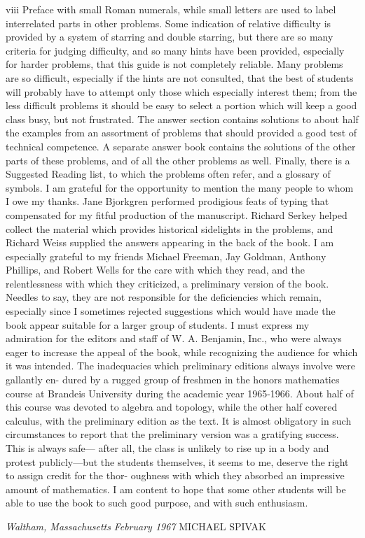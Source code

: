 viii Preface
with small Roman numerals, while small letters are used to label interrelated parts
in other problems. Some indication of relative difficulty is provided by a system of
starring and double starring, but there are so many criteria for judging difficulty,
and so many hints have been provided, especially for harder problems, that this
guide is not completely reliable. Many problems are so difficult, especially if the
hints are not consulted, that the best of students will probably have to attempt only
those which especially interest them; from the less difficult problems it should be
easy to select a portion which will keep a good class busy, but not frustrated. The
answer section contains solutions to about half the examples from an assortment
of problems that should provided a good test of technical competence. A separate
answer book contains the solutions of the other parts of these problems, and of all
the other problems as well. Finally, there is a Suggested Reading list, to which the
problems often refer, and a glossary of symbols.
I am grateful for the opportunity to mention the many people to whom I owe my
thanks. Jane Bjorkgren performed prodigious feats of typing that compensated for
my fitful production of the manuscript. Richard Serkey helped collect the material
which provides historical sidelights in the problems, and Richard Weiss supplied
the answers appearing in the back of the book. I am especially grateful to my
friends Michael Freeman, Jay Goldman, Anthony Phillips, and Robert Wells for
the care with which they read, and the relentlessness with which they criticized, a
preliminary version of the book. Needles to say, they are not responsible for the
deficiencies which remain, especially since I sometimes rejected suggestions which
would have made the book appear suitable for a larger group of students. I must
express my admiration for the editors and staff of W. A. Benjamin, Inc., who were
always eager to increase the appeal of the book, while recognizing the audience
for which it was intended.
The inadequacies which preliminary editions always involve were gallantly en-
dured by a rugged group of freshmen in the honors mathematics course at Brandeis
University during the academic year 1965-1966. About half of this course was
devoted to algebra and topology, while the other half covered calculus, with the
preliminary edition as the text. It is almost obligatory in such circumstances to
report that the preliminary version was a gratifying success. This is always safe—
after all, the class is unlikely to rise up in a body and protest publicly—but the
students themselves, it seems to me, deserve the right to assign credit for the thor-
oughness with which they absorbed an impressive amount of mathematics. I am
content to hope that some other students will be able to use the book to such good
purpose, and with such enthusiasm.

\textit{Waltham, Massachusetts}
\textit{February 1967}
\hfill MICHAEL SPIVAK